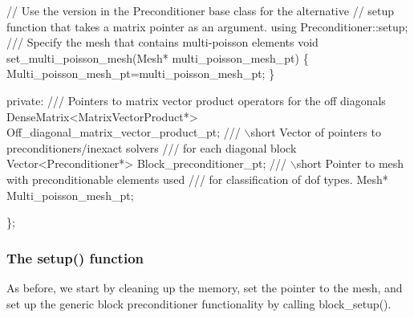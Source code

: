 \begin{DoxyCodeInclude}
  \textcolor{comment}{// Use the version in the Preconditioner base class for the alternative}
  \textcolor{comment}{// setup function that takes a matrix pointer as an argument.}
  \textcolor{keyword}{using} Preconditioner::setup;
\textcolor{comment}{}
\textcolor{comment}{  /// Specify the mesh that contains multi-poisson elements}
\textcolor{comment}{}  \textcolor{keywordtype}{void} set\_multi\_poisson\_mesh(Mesh* multi\_poisson\_mesh\_pt)
  \{
   Multi\_poisson\_mesh\_pt=multi\_poisson\_mesh\_pt;
  \}

 \textcolor{keyword}{private}:  
\textcolor{comment}{}
\textcolor{comment}{  /// Pointers to matrix vector product operators for the off diagonals}
\textcolor{comment}{}  DenseMatrix<MatrixVectorProduct*> Off\_diagonal\_matrix\_vector\_product\_pt;
\textcolor{comment}{}
\textcolor{comment}{  /// \(\backslash\)short Vector of pointers to preconditioners/inexact solvers }
\textcolor{comment}{  /// for each diagonal block}
\textcolor{comment}{}  Vector<Preconditioner*> Block\_preconditioner\_pt;
\textcolor{comment}{}
\textcolor{comment}{  /// \(\backslash\)short Pointer to mesh with preconditionable elements used}
\textcolor{comment}{  /// for classification of dof types.}
\textcolor{comment}{}  Mesh* Multi\_poisson\_mesh\_pt;

 \};

\end{DoxyCodeInclude}
\hypertarget{index_upper_triangular_setup}{}\subsubsection{The setup() function}\label{index_upper_triangular_setup}
As before, we start by cleaning up the memory, set the pointer to the mesh, and set up the generic block preconditioner functionality by calling {\ttfamily block\+\_\+setup()}.


